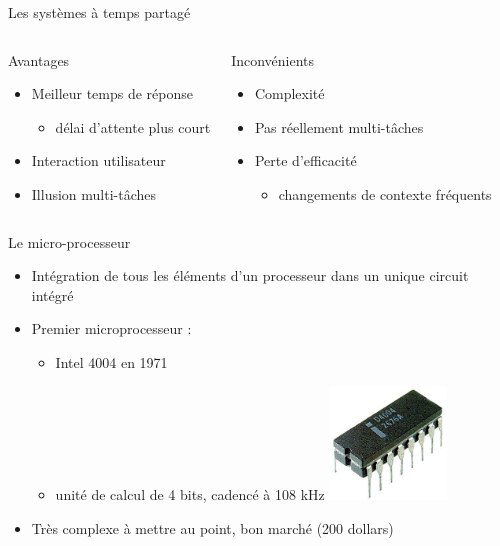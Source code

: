 \begin{frame}{Les systèmes à temps partagé}
\begin{columns}
\begin{block}{Avantages}
\begin{itemize}
\item Meilleur temps de réponse
\begin{itemize}
\item délai d’attente plus court
\end{itemize}
\item Interaction utilisateur
\item Illusion multi-tâches
\end{itemize}
\end{block}
\begin{block}{Inconvénients}
\begin{itemize}
\item Complexité
\item Pas réellement multi-tâches
\item Perte d'efficacité
\begin{itemize}
\item changements de contexte fréquents
\end{itemize}
\end{itemize}
\end{block}
\end{columns}
\end{frame}


\begin{frame}{Le micro-processeur}
\begin{itemize}
\item Intégration de tous les éléments d'un processeur dans un unique circuit intégré
\item Premier microprocesseur : 
\begin{itemize}
\item Intel 4004 en 1971
\item unité de calcul de 4 bits, cadencé à 108 kHz
\includegraphics[height=3cm]{../illustration/Intel4004.jpg}
\end{itemize}
\item Très complexe à mettre au point, bon marché (200 dollars)
\end{itemize}
\end{frame}

